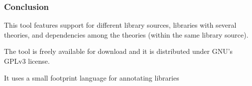 \documentclass[mathserif,fleqn]{beamer}
\begin{document}
\begin{frame}
  \frametitle{Conclusion}

  \begin{outeritemize}
  \item This tool features support for different library sources, libraries with several theories, and dependencies among the theories (within the same library source).
  \item  The tool is freely available for download and it is distributed under GNU's GPLv3 license.
  \item It uses a small footprint language for annotating libraries
  \end{outeritemize}

\end{frame}

\begin{frame}

  \begin{center}
      {\LARGE {}}
  \end{center}
\end{frame}
\end{document}
